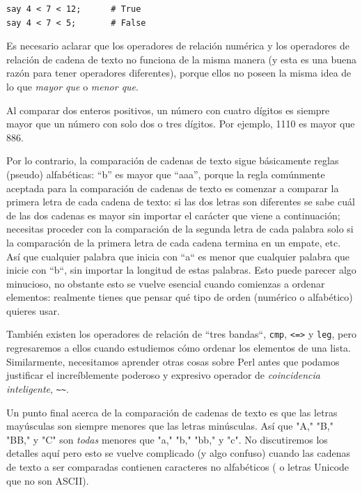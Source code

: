 \begin{verbatim}
say 4 < 7 < 12;      # True
say 4 < 7 < 5;       # False
\end{verbatim}

Es necesario aclarar que los operadores de relación
numérica y los operadores de relación de cadena de texto no 
funciona de la misma manera (y esta es una buena razón 
para tener operadores diferentes), porque ellos no poseen
la misma idea de lo que \emph{mayor que} o \emph{menor que}.

Al comparar dos enteros positivos, un número con cuatro dígitos
es siempre mayor que un número con solo dos o tres dígitos. 
Por ejemplo, 1110 es mayor que 886. 

Por lo contrario, la comparación de cadenas de texto
sigue básicamente reglas (pseudo) alfabéticas: 
``b'' es mayor que ``aaa'', porque la regla comúnmente
aceptada para la comparación de cadenas de texto es
comenzar a comparar la primera letra de cada cadena
de texto: si las dos letras son diferentes se sabe cuál de
las dos cadenas es mayor sin importar el carácter que viene
a continuación; necesitas proceder con la comparación
de la segunda letra de cada palabra solo si la comparación
de la primera letra de cada cadena termina en un empate, etc.
Así que cualquier palabra que inicia con ``a`` es menor que 
cualquier palabra que inicie con ``b``, sin importar la longitud
de estas palabras. Esto puede parecer algo minucioso, no 
obstante esto se vuelve esencial cuando comienzas 
a ordenar elementos: realmente tienes que pensar qué tipo
de orden (numérico o alfabético) quieres usar.

También existen los operadores de relación de ``tres bandas``,
{\tt cmp}, {\tt <=>} y {\tt leg}, pero regresaremos a ellos
cuando estudiemos cómo ordenar los elementos de una lista. 
Similarmente, necesitamos aprender otras cosas sobre Perl antes
que podamos justificar el increíblemente poderoso y expresivo
operador de \emph{coincidencia inteligente}, \verb|~~|.
\ifplastex \else
{}
\fi

Un punto final acerca de la comparación de cadenas
de texto es que las letras mayúsculas son siempre menores
que las letras minúsculas. Así que  "A," "B," "BB," y "C"
son \emph{todas} menores que "a," "b," "bb," y "c".
No discutiremos los detalles aquí pero esto se vuelve
complicado (y algo confuso) cuando las cadenas de texto
a ser comparadas contienen caracteres no alfabéticos (
o letras Unicode que no son ASCII).

